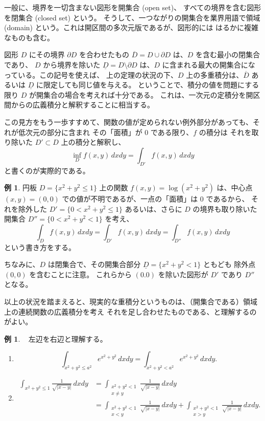 \documentclass[a4paper]{jsarticle}
\theoremstyle{definition}
\newtheorem{Example}[Theorem]{例}
\theoremstyle{remark}
\begin{document}
一般に、境界を一切含まない図形を開集合 (open set)、
すべての境界を含む図形を閉集合 (closed set) という。
そうして、一つながりの開集合を業界用語で領域 (domain) という。これは開区間の多次元版であるが、図形的には はるかに複雑なものも含む。

図形 $D$ にその境界 $\partial D$ を合わせたもの $\overline{D} = D \cup \partial D$ は、$D$ を含む最小の閉集合であり、
$D$ から境界を除いた $\underline{D} = D \setminus \partial D$ は、$D$ に含まれる最大の開集合になっている。この記号を使えば、
上の定理の状況の下、$D$ 上の多重積分は、$\overline{D}$ あるいは $\underline{D}$ に限定しても同じ値を与える。
ということで、積分の値を問題にする限り $D$ が開集合の場合を考えれば十分である。
これは、一次元の定積分を開区間からの広義積分と解釈することに相当する。

この見方をもう一歩すすめて、関数の値が定められない例外部分があっても、それが低次元の部分に含まれ その「面積」が $0$ である限り、$f$ の積分は 
それを取り除いた $D' \subset D$ 上の積分と解釈し、
\[
  \inf_D f(x,y)\, dxdy = \int_{D'} f(x,y)\, dxdy
\]
と書くのが実際的である。

\begin{Example}
  円板 $D = \{ x^2 + y^2 \leq 1\}$ 上の関数 $f(x,y) = \log(x^2+y^2)$ は、中心点 $(x,y) = (0,0)$ での値が不明であるが、一点の「面積」は $0$ であるから、
  それを除外した $D' = \{ 0 < x^2 + y^2 \leq 1\}$ あるいは、さらに $D$ の境界も取り除いた開集合 $D'' = \{ 0 < x^2 + y^2 < 1\}$ を考え、
  \[
    \int_D f(x,y)\, dxdy= \int_{D'} f(x,y)\, dxdy = \int_{D''} f(x,y)\, dxdy
  \]
  という書き方をする。

  ちなみに、$D$ は閉集合で、その開集合部分 $\underline{D} = \{ x^2 + y^2 < 1\}$ ともども 除外点 $(0,0)$ を含むことに注意。
  これらから $(0.0)$ を除いた図形が $D'$ であり $D''$ となる。
\end{Example}

以上の状況を踏まえると、現実的な重積分というものは、（開集合である）領域上の連続関数の広義積分を考え それを足し合わせたものである、と理解するのがよい。

\begin{Example}~
 左辺を右辺と理解する。
  \begin{enumerate}
    \item
  \[
    \int_{x^2 + y^2 \leq a^2} e^{x^2+y^2}\, dxdy =  \int_{x^2 + y^2 < a^2} e^{x^2+y^2}\, dxdy. 
  \]
  \item
  \begin{align*}
    \int_{x^2 + y^2 \leq 1} \frac{1}{\sqrt{|x-y|}}\, dxdy
    &= \int_{\substack{x^2 + y^2 < 1\\ x \not= y}} \frac{1}{\sqrt{|x-y|}}\, dxdy\\
    &= \int_{\substack{x^2 + y^2 < 1\\ x < y}} \frac{1}{\sqrt{|x-y|}}\, dxdy
    + \int_{\substack{x^2 + y^2 < 1\\ x > y}} \frac{1}{\sqrt{|x-y|}}\, dxdy. 
  \end{align*}
\end{enumerate}
\end{Example}
\end{document}
